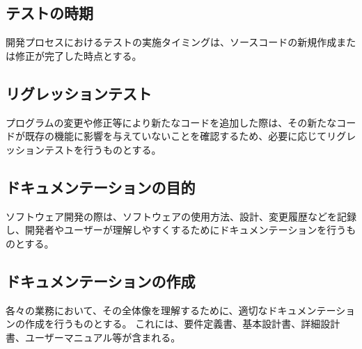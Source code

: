 \subsection{テストの時期}
開発プロセスにおけるテストの実施タイミングは、ソースコードの新規作成または修正が完了した時点とする。

\subsection{リグレッションテスト}
プログラムの変更や修正等により新たなコードを追加した際は、その新たなコードが既存の機能に影響を与えていないことを確認するため、必要に応じてリグレッションテストを行うものとする。



\clearpage

\subsection{ドキュメンテーションの目的}
ソフトウェア開発の際は、ソフトウェアの使用方法、設計、変更履歴などを記録し、開発者やユーザーが理解しやすくするためにドキュメンテーションを行うものとする。

\subsection{ドキュメンテーションの作成}
各々の業務において、その全体像を理解するために、適切なドキュメンテーションの作成を行うものとする。
これには、要件定義書、基本設計書、詳細設計書、ユーザーマニュアル等が含まれる。


